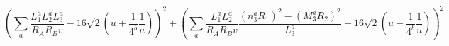 \begin{equation}
\left(\sum_a \frac{L^a_1L^a_2L^a_3}{R_AR_Bv}-16 \sqrt{2}( u+\frac{1}{4^b}\frac{1}{u})\right)^2
+\left(\sum_a \frac{L^a_1L^a_2}{R_AR_Bv}\frac{(n^a_3R_1)^2-(M^a_3R_2)^2}{L^a_3}
-16\sqrt{2}( u-\frac{1}{4^b}\frac{1}{u})\right)^2
\nonumber
\end{equation}

